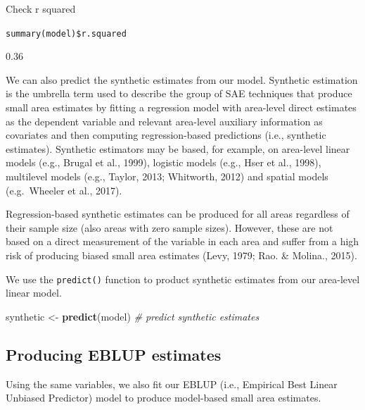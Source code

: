 \documentclass[
]{article}
\newenvironment{Shaded}{\begin{snugshade}}{\end{snugshade}}
\newcommand{\CommentTok}[1]{\textcolor[rgb]{0.56,0.35,0.01}{\textit{#1}}}
\newcommand{\KeywordTok}[1]{\textcolor[rgb]{0.13,0.29,0.53}{\textbf{#1}}}
\newcommand{\NormalTok}[1]{#1}
\newcommand{\OperatorTok}[1]{\textcolor[rgb]{0.81,0.36,0.00}{\textbf{#1}}}
\newcommand{\StringTok}[1]{\textcolor[rgb]{0.31,0.60,0.02}{#1}}
\begin{document}
Check r squared

\texttt{summary(model)\$r.squared}

0.36

We can also predict the synthetic estimates from our model. Synthetic
estimation is the umbrella term used to describe the group of SAE
techniques that produce small area estimates by fitting a regression
model with area-level direct estimates as the dependent variable and
relevant area-level auxiliary information as covariates and then
computing regression-based predictions (i.e., synthetic estimates).
Synthetic estimators may be based, for example, on area-level linear
models (e.g., Brugal et al., 1999), logistic models (e.g., Hser et al.,
1998), multilevel models (e.g., Taylor, 2013; Whitworth, 2012) and
spatial models (e.g.~Wheeler et al., 2017).

Regression-based synthetic estimates can be produced for all areas
regardless of their sample size (also areas with zero sample sizes).
However, these are not based on a direct measurement of the variable in
each area and suffer from a high risk of producing biased small area
estimates (Levy, 1979; Rao. \& Molina., 2015).

We use the \texttt{predict()} function to product synthetic estimates
from our area-level linear model.

\begin{Shaded}
\begin{Highlighting}[]
\NormalTok{synthetic <-}\StringTok{ }\KeywordTok{predict}\NormalTok{(model) }\CommentTok{# predict synthetic estimates}
\end{Highlighting}
\end{Shaded}

\begin{Shaded}
\end{Shaded}

\hypertarget{producing-eblup-estimates}{%
\subsection{Producing EBLUP estimates}\label{producing-eblup-estimates}}

Using the same variables, we also fit our EBLUP (i.e., Empirical Best
Linear Unbiased Predictor) model to produce model-based small area
estimates.
\end{document}
